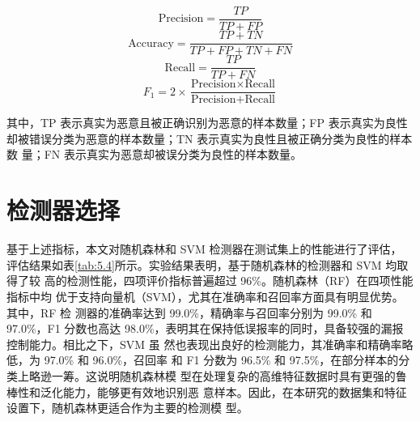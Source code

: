 \begin{equation}
	\text{Precision} = \frac{TP}{TP + FP}
	\tag{5.1}
\end{equation}
\begin{equation}
	\text{Accuracy} = \frac{TP + TN}{TP + FP + TN + FN}
	\tag{5.2}
\end{equation}
\begin{equation}
	\text{Recall} = \frac{TP}{TP + FN}
	\tag{5.3}
\end{equation}
\begin{equation}
	F_1 = 2 \times \frac{\text{Precision} \times \text{Recall}}{\text{Precision} + \text{Recall}}
	\tag{5.4}
\end{equation}

其中，TP 表示真实为恶意且被正确识别为恶意的样本数量；FP 表示真实为良性
却被错误分类为恶意的样本数量；TN 表示真实为良性且被正确分类为良性的样本数
量；FN 表示真实为恶意却被误分类为良性的样本数量。


\section{检测器选择}

基于上述指标，本文对随机森林和 SVM 检测器在测试集上的性能进行了评估，
评估结果如表\ref{tab:5.4}所示。实验结果表明，基于随机森林的检测器和 SVM 均取得了较
高的检测性能，四项评价指标普遍超过 96\%。随机森林（RF）在四项性能指标中均
优于支持向量机（SVM），尤其在准确率和召回率方面具有明显优势。其中，RF 检
测器的准确率达到 99.0\%，精确率与召回率分别为 99.0\% 和 97.0\%，F1 分数也高达
98.0\%，表明其在保持低误报率的同时，具备较强的漏报控制能力。相比之下，SVM 虽
然也表现出良好的检测能力，其准确率和精确率略低，为 97.0\% 和 96.0\%，召回率
和 F1 分数为 96.5\% 和 97.5\%，在部分样本的分类上略逊一筹。这说明随机森林模
型在处理复杂的高维特征数据时具有更强的鲁棒性和泛化能力，能够更有效地识别恶
意样本。因此，在本研究的数据集和特征设置下，随机森林更适合作为主要的检测模
型。

